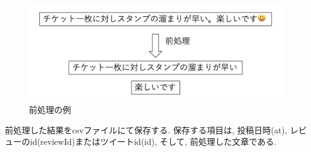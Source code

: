 \begin{figure}[H]
 \centering
 \includegraphics[scale=0.5]
      {contents/images/preprocessing.png}
 \caption{前処理の例\label{fig:preprocessing}}
\end{figure}

前処理した結果をcsvファイルにて保存する. 保存する項目は, 投稿日時(at), レビューのid(reviewId)またはツイートid(id), そして, 前処理した文章である. 


